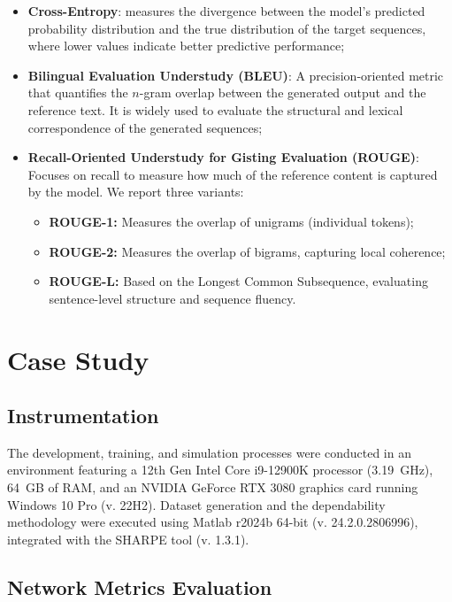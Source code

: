 \begin{itemize}
    \item \textbf{Cross-Entropy}: measures the divergence between the model's predicted probability distribution and the true distribution of the target sequences, where lower values indicate better predictive performance;

    \item \textbf{Bilingual Evaluation Understudy (BLEU)}: A precision-oriented metric that quantifies the $n$-gram overlap between the generated output and the reference text. It is widely used to evaluate the structural and lexical correspondence of the generated sequences;

    \item \textbf{Recall-Oriented Understudy for Gisting Evaluation (ROUGE)}: Focuses on recall to measure how much of the reference content is captured by the model. We report three variants:
    \begin{itemize}
        \item \textbf{ROUGE-1:} Measures the overlap of unigrams (individual tokens);
        \item \textbf{ROUGE-2:} Measures the overlap of bigrams, capturing local coherence;
        \item \textbf{ROUGE-L:} Based on the Longest Common Subsequence, evaluating sentence-level structure and sequence fluency.
    \end{itemize}

\end{itemize}




\section{Case Study} \label{sec:case_study}

\subsection{Instrumentation}

The development, training, and simulation processes were conducted in an environment featuring a 12th Gen Intel Core i9-12900K processor (3.19~GHz), 64~GB of RAM, and an NVIDIA GeForce RTX 3080 graphics card running Windows 10 Pro (v. 22H2). Dataset generation and the dependability methodology were executed using Matlab r2024b 64-bit (v. 24.2.0.2806996), integrated with the SHARPE tool (v. 1.3.1).


\subsection{Network Metrics Evaluation}

